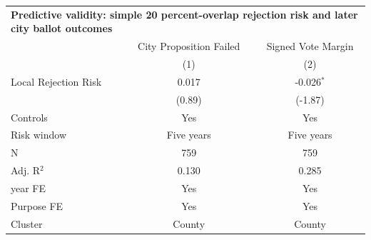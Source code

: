 \begingroup
\centering
\begin{tabular*}{\textwidth}{@{\extracolsep{\fill}}lcc}
\multicolumn{3}{l}{\textbf{Predictive validity: simple 20 percent-overlap rejection risk and later city ballot outcomes}}\\

\addlinespace
   \toprule
                        & City Proposition Failed & Signed Vote Margin\\
                        & (1)                     & (2)\\
   \midrule
   Local Rejection Risk & 0.017                   & -0.026$^{*}$\\
                        & (0.89)                 & (-1.87)\\
   Controls             & Yes                     & Yes\\
   Risk window          & Five years              & Five years\\
   \hline
   N         & 759                     & 759\\
   Adj. R$^2$       & 0.130                   & 0.285\\
   year FE              & Yes                     & Yes\\
   Purpose FE           & Yes                     & Yes\\
   Cluster              & County & County\\
   \bottomrule
\end{tabular*}
\par\endgroup
